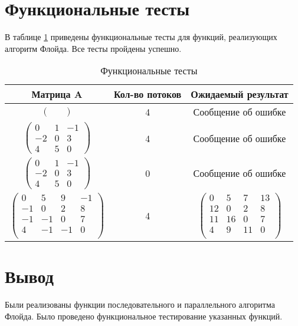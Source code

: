 \section{Функциональные тесты}

В таблице \ref{tbl:func_test} приведены функциональные тесты для функций, реализующих алгоритм Флойда. Все тесты пройдены успешно.

\begin{table}[h]
	\begin{center}
		\begin{threeparttable}
		\captionsetup{justification=raggedright,singlelinecheck=off}
		\caption{\label{tbl:func_test} Функциональные тесты}
		\begin{tabular}{|c|c|c|}
			\hline
			Матрица A & Кол-во потоков & Ожидаемый результат \\ 
			\hline
			$\begin{pmatrix}
				&
			\end{pmatrix}$ &
			4 &
			Сообщение об ошибке \\
			\hline

			$\begin{pmatrix}
				0 & 1 & -1 \\
				-2 & 0 & 3 \\
				4 & 5 & 0
			\end{pmatrix}$ &
			4 &
			Сообщение об ошибке \\
			\hline
 
			$\begin{pmatrix}
				0 & 1 & -1 \\
				-2 & 0 & 3 \\
				4 & 5 & 0
			\end{pmatrix}$ &
			0 &
			Сообщение об ошибке \\
			\hline

			$\begin{pmatrix}
				0 & 5 & 9 & -1 \\
				-1 & 0 & 2 & 8 \\
				-1 & -1 & 0 & 7 \\
				4 & -1 & -1 & 0 \\
			\end{pmatrix}$ &
			4 &
			$\begin{pmatrix}
				0 & 5 & 7 & 13 \\
				12 & 0 & 2 & 8 \\
				11 & 16 & 0 & 7 \\
				4 & 9 & 11 & 0 \\
			\end{pmatrix}$ \\
			\hline

		\end{tabular}
		\end{threeparttable}
	\end{center}
	
\end{table}

\section{Вывод}

Были реализованы функции последовательного и параллельного алгоритма Флойда. Было проведено функциональное тестирование указанных функций.